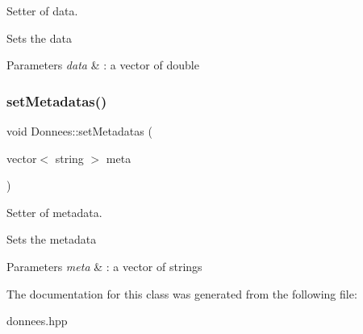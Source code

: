 Setter of data. 

Sets the data 
\begin{DoxyParams}{Parameters}
{\em data} & \+: a vector of double \\
\hline
\end{DoxyParams}
\hypertarget{classDonnees_aaea7bb6bb8f2b88645847429d71ba3f6}{}\label{classDonnees_aaea7bb6bb8f2b88645847429d71ba3f6} 
\subsubsection{\texorpdfstring{set\+Metadatas()}{setMetadatas()}}
{\footnotesize\ttfamily void Donnees\+::set\+Metadatas (\begin{DoxyParamCaption}\item[{vector$<$ string $>$}]{meta }\end{DoxyParamCaption})}



Setter of metadata. 

Sets the metadata 
\begin{DoxyParams}{Parameters}
{\em meta} & \+: a vector of strings \\
\hline
\end{DoxyParams}


The documentation for this class was generated from the following file\+:\begin{DoxyCompactItemize}
\item 
donnees.\+hpp\end{DoxyCompactItemize}
